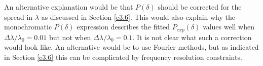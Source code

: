 An alternative explanation would be that $P(\delta)$ should be corrected for the spread in $\lambda$ as discussed in Section \ref{c3.6}. This would also explain why the monochromatic $P(\delta)$ expression describes the fitted $P_{exp}(\delta)$ values well when $\Delta\lambda/\lambda_0 = 0.01$ but not when $\Delta\lambda/\lambda_0 = 0.1$. It is not clear what such a correction would look like. An alternative would be to use Fourier methods, but as indicated in Section \ref{c3.6} this can be complicated by frequency resolution constraints.